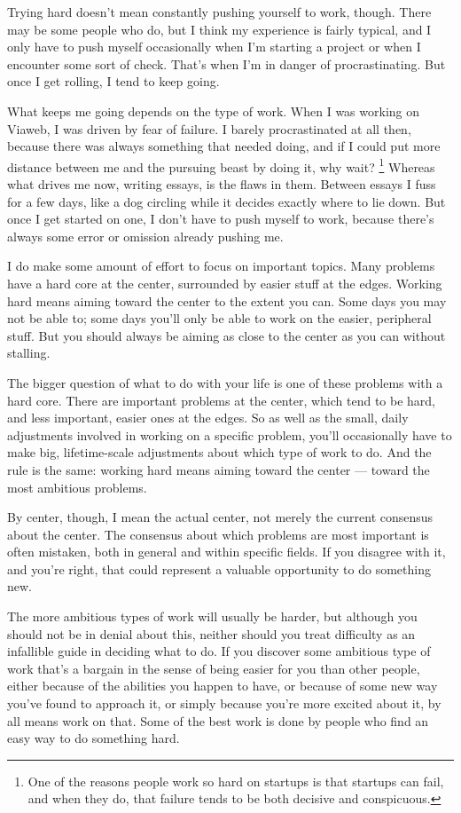 \documentclass[12pt]{book}
\begin{document}
Trying hard doesn't mean constantly pushing yourself to work, though.
There may be some people who do, but I think my experience is fairly
typical, and I only have to push myself occasionally when I'm starting a
project or when I encounter some sort of check. That's when I'm in
danger of procrastinating. But once I get rolling, I tend to keep going.

What keeps me going depends on the type of work. When I was working on
Viaweb, I was driven by fear of failure. I barely procrastinated at all
then, because there was always something that needed doing, and if I
could put more distance between me and the pursuing beast by doing it,
why wait? \footnote{One of the reasons people work so hard on startups is that
startups can fail, and when they do, that failure tends to be both
decisive and conspicuous.} Whereas what drives me now, writing
essays, is the flaws in them. Between essays I fuss for a few days, like
a dog circling while it decides exactly where to lie down. But once I
get started on one, I don't have to push myself to work, because there's
always some error or omission already pushing me.

I do make some amount of effort to focus on important topics. Many
problems have a hard core at the center, surrounded by easier stuff at
the edges. Working hard means aiming toward the center to the extent you
can. Some days you may not be able to; some days you'll only be able to
work on the easier, peripheral stuff. But you should always be aiming as
close to the center as you can without stalling.

The bigger question of what to do with your life is one of these
problems with a hard core. There are important problems at the center,
which tend to be hard, and less important, easier ones at the edges. So
as well as the small, daily adjustments involved in working on a
specific problem, you'll occasionally have to make big, lifetime-scale
adjustments about which type of work to do. And the rule is the same:
working hard means aiming toward the center --- toward the most
ambitious problems.

By center, though, I mean the actual center, not merely the current
consensus about the center. The consensus about which problems are most
important is often mistaken, both in general and within specific fields.
If you disagree with it, and you're right, that could represent a
valuable opportunity to do something new.

The more ambitious types of work will usually be harder, but although
you should not be in denial about this, neither should you treat
difficulty as an infallible guide in deciding what to do. If you
discover some ambitious type of work that's a bargain in the sense of
being easier for you than other people, either because of the abilities
you happen to have, or because of some new way you've found to approach
it, or simply because you're more excited about it, by all means work on
that. Some of the best work is done by people who find an easy way to do
something hard.
\end{document}
